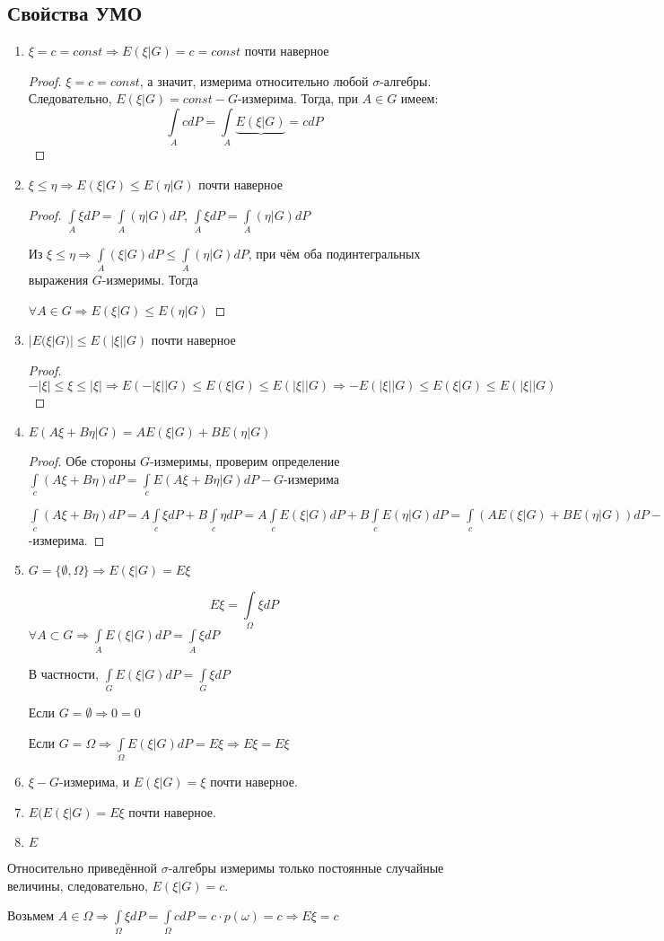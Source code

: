 \subsection{Свойства УМО}
\begin{enumerate}
\item $\xi = c = const \Rightarrow E(\xi | G) = c = const$ почти наверное
\begin{proof}
 $\xi = c = const$, а значит, измерима относительно любой $\sigma$-алгебры. Следовательно,
 $E(\xi | G) = const - G$-измерима. Тогда, при $A \in G$ имеем:
 $$\int\limits_A c dP = \int\limits_A \underbrace{E(\xi | G)}{=c} dP$$
\end{proof}
\item $\xi \leqslant \eta \Rightarrow E(\xi | G) \leqslant E(\eta | G)$ почти наверное
\begin{proof}
$\int\limits_A \xi dP = \int\limits_A (\eta | G) dP$, $\int\limits_A \xi dP = \int\limits_A (\eta | G) dP$

Из $\xi \leqslant \eta \Rightarrow \int\limits_A (\xi | G) dP \leqslant \int\limits_A (\eta | G) dP$, при чём оба подинтегральных выражения $G$-измеримы. Тогда

$\forall A \in G \Rightarrow E(\xi | G) \leqslant E(\eta | G)$
\end{proof}
\item $|E(\xi | G)| \leqslant E(|\xi| | G)$ почти наверное
\begin{proof}
$-|\xi|\leqslant \xi\leqslant |\xi| \Rightarrow E(-|\xi| | G)\leqslant E(\xi | G)\leqslant E(|\xi| | G)\Rightarrow -E(|\xi| | G)\leqslant E(\xi | G)\leqslant E(|\xi| | G)$
\end{proof}
\item $E(A \xi + B \eta | G) = A E(\xi | G) + B E(\eta | G)$
\begin{proof}
Обе стороны $G$-измеримы, проверим определение
$\int\limits_c (A\xi + B\eta) dP = \int\limits_c E(A\xi+B\eta | G) dP - G$-измерима

$\int\limits_c (A\xi + B\eta) dP = A\int\limits_c \xi dP + B\int\limits_c \eta dP = A\int\limits_c E(\xi | G) dP + B\int\limits_c E(\eta | G) dP = \int\limits_c (A E(\xi | G) + B E(\eta |G)) dP - G$-измерима.
\end{proof}
\item $G = \{\emptyset, \Omega\} \Rightarrow E(\xi | G) = E\xi$
\begin{proposition}
$$E\xi = \int\limits_\Omega \xi dP$$
$\forall A \subset G \Rightarrow \int\limits_A E(\xi | G) dP = \int\limits_A\xi dP$

В частности, $\int\limits_G E(\xi | G) dP = \int\limits_G\xi dP$

Если $G = \emptyset \Rightarrow 0 = 0$

Если $G = \Omega \Rightarrow \int\limits_\Omega E(\xi | G)dP = E\xi \Rightarrow E\xi = E\xi$
\end{proposition}
\item $\xi - G$-измерима, и $E(\xi | G) = \xi$ почти наверное.
\item $E(E(\xi | G) = E\xi$ почти наверное.
\item $E$
\end{enumerate}
Относительно приведённой $\sigma$-алгебры измеримы только постоянные случайные величины, следовательно, $E(\xi | G) = c$.

Возьмем $A\in\Omega \Rightarrow \int\limits_\Omega \xi dP = \int\limits_\Omega c dP = c \cdot p(\omega) = c \Rightarrow E\xi = c$
